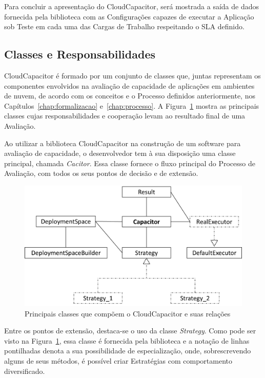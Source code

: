 Para concluir a apresentação do CloudCapacitor, será mostrada a saída de dados
fornecida pela biblioteca com as Configurações capazes de executar a
Aplicação sob Teste em cada uma das Cargas de Trabalho respeitando o SLA definido.

\subsection{Classes e Responsabilidades}
\label{subsec:classes}
CloudCapacitor é formado por um conjunto de classes que, juntas representam os
componentes envolvidos na avaliação de capacidade de aplicações em ambientes de
nuvem, de acordo com os conceitos e o Processo definidos anteriormente, nos
Capítulos~\ref{chap:formalizacao} e~\ref{chap:processo}. A Figura~\ref{fig:classes}
mostra as principais classes cujas responsabilidades e cooperação levam ao 
resultado final de uma Avaliação. 

Ao utilizar a biblioteca CloudCapacitor na construção de um software para avaliação
de capacidade, o desenvolvedor tem à sua disposição uma classe principal, chamada
\emph{Cacitor}. Essa classe fornece o fluxo principal do Processo de Avaliação, com todos
os seus pontos de decisão e de extensão.

\begin{figure}[htb]
  \caption{\label{fig:classes}Principais classes que compõem o CloudCapacitor e suas relações}
  \begin{center}
    \includegraphics[scale=0.75]{img/CapacitorClasses}
  \end{center}
\end{figure}

Entre os pontos de extensão, destaca-se o uso da classe \emph{Strategy}. Como 
pode ser visto na Figura~\ref{fig:classes}, essa classe é fornecida pela biblioteca e a
notação de linhas pontilhadas denota a sua possibilidade de especialização, onde,
sobrescrevendo alguns de seus métodos, é possível criar Estratégias com comportamento
diversificado.

